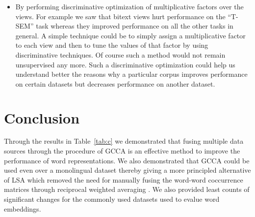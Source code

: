 \documentclass[11pt]{article}
\begin{document}
\begin{itemize}[leftmargin=*]
\item By performing discriminative optimization of multiplicative
  factors over the views. For example we saw that bitext views hurt
  performance on the ``T-SEM'' task whereas they improved performance
  on all the other tasks in general. A simple technique could be to
  simply assign a multiplicative factor to each view and 
  then to tune the values of that factor by using discriminative
  techniques. Of course such a method would not remain unsupervised any
  more. Such a discriminative optimization could help us understand
  better the reasons why a particular corpus improves performance on
  certain datasets but decreases performance on another dataset. %
\end{itemize}

\section{Conclusion}
Through the results in Table~\ref{tab:c} we demonstrated that fusing
multiple data sources through the procedure of GCCA is an effective
method to improve the performance of word representations. We also
demonstrated that GCCA could be used even over a monolingual dataset
thereby giving a more principled alternative of LSA which removed the
need for manually fusing the word-word coccurrence matrices through
reciprocal weighted averaging \cite{pennington2014glove}. We also
provided least counts of significant changes for the commonly used
datasets used to evalue word embeddings. 




\end{document}
